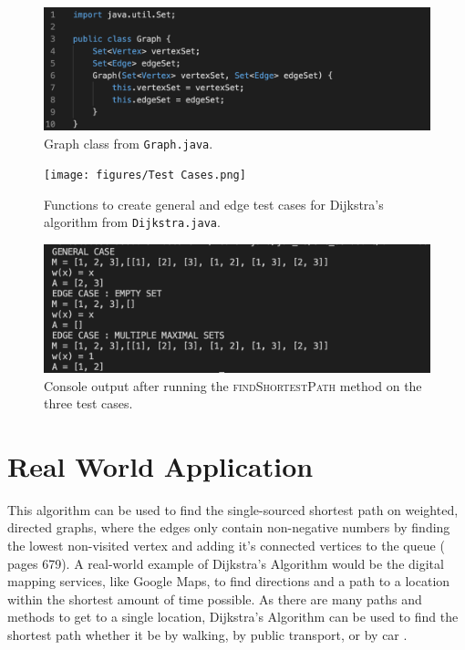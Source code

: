 \documentclass[12pt]{article}
\begin{document}
\begin{figure}[h]
    \centering
    \includegraphics[scale=.8]{figures/Graph.png}
    \caption{Graph class from \texttt{Graph.java}.}
\end{figure}

\begin{figure}[h]
    \centering
    \texttt{[image: figures/Test Cases.png]}
    \caption{Functions to create general and edge test cases for Dijkstra's algorithm from \texttt{Dijkstra.java}.}
\end{figure}

\begin{figure}[h]
    \centering
    \includegraphics[scale=1]{figures/Output.png}
    \caption{Console output after running the \textsc{findShortestPath} method on the three test cases.}
\end{figure}


\clearpage
\section*{Real World Application}
This algorithm can be used to find the single-sourced shortest path on weighted, directed graphs, where the edges only contain non-negative numbers by finding the lowest non-visited vertex and adding it's connected vertices to the queue (\cite{cormen2009introduction} pages 679). A real-world example of Dijkstra's Algorithm would be the digital mapping services, like Google Maps, to find directions and a path to a location within the shortest amount of time possible. As there are many paths and methods to get to a single location, Dijkstra's Algorithm can be used to find the shortest path whether it be by walking, by public transport, or by car \cite{GeekforGeeks}.


\clearpage


\end{document}
